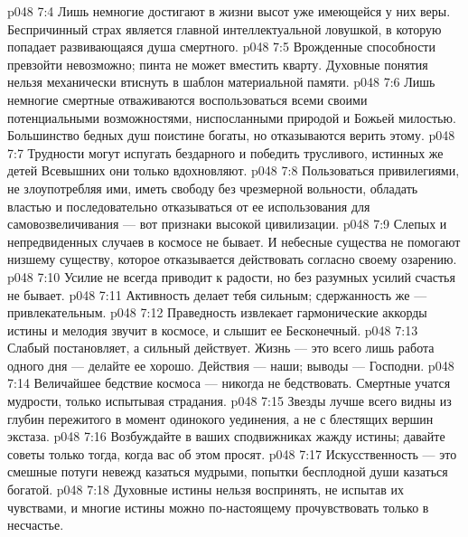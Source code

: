 \vs p048 7:4 \pc {}\bibnobreakspace Лишь немногие достигают в жизни высот уже имеющейся у них веры. Беспричинный страх является главной интеллектуальной ловушкой, в которую попадает развивающаяся душа смертного.
\vs p048 7:5 \pc {}\bibnobreakspace Врожденные способности превзойти невозможно; пинта не может вместить кварту. Духовные понятия нельзя механически втиснуть в шаблон материальной памяти.
\vs p048 7:6 \pc {}\bibnobreakspace Лишь немногие смертные отваживаются воспользоваться всеми своими потенциальными возможностями, ниспосланными природой и Божьей милостью. Большинство бедных душ поистине богаты, но отказываются верить этому.
\vs p048 7:7 \pc {}\bibnobreakspace Трудности могут испугать бездарного и победить трусливого, истинных же детей Всевышних они только вдохновляют.
\vs p048 7:8 \pc {}\bibnobreakspace Пользоваться привилегиями, не злоупотребляя ими, иметь свободу без чрезмерной вольности, обладать властью и последовательно отказываться от ее использования для самовозвеличивания --- вот признаки высокой цивилизации.
\vs p048 7:9 \pc {}\bibnobreakspace Слепых и непредвиденных случаев в космосе не бывает. И небесные существа не помогают низшему существу, которое отказывается действовать согласно своему озарению.
\vs p048 7:10 \pc {}\bibnobreakspace Усилие не всегда приводит к радости, но без разумных усилий счастья не бывает.
\vs p048 7:11 \pc {}\bibnobreakspace Активность делает тебя сильным; сдержанность же --- привлекательным.
\vs p048 7:12 \pc {}\bibnobreakspace Праведность извлекает гармонические аккорды истины и мелодия звучит в космосе, и слышит ее Бесконечный.
\vs p048 7:13 \pc {}\bibnobreakspace Слабый постановляет, а сильный действует. Жизнь --- это всего лишь работа одного дня --- делайте ее хорошо. Действия --- наши; выводы --- Господни.
\vs p048 7:14 \pc {}\bibnobreakspace Величайшее бедствие космоса --- никогда не бедствовать. Смертные учатся мудрости, только испытывая страдания.
\vs p048 7:15 \pc {}\bibnobreakspace Звезды лучше всего видны из глубин пережитого в момент одинокого уединения, а не с блестящих вершин экстаза.
\vs p048 7:16 \pc {}\bibnobreakspace Возбуждайте в ваших сподвижниках жажду истины; давайте советы только тогда, когда вас об этом просят.
\vs p048 7:17 \pc {}\bibnobreakspace Искусственность --- это смешные потуги невежд казаться мудрыми, попытки бесплодной души казаться богатой.
\vs p048 7:18 \pc {}\bibnobreakspace Духовные истины нельзя воспринять, не испытав их чувствами, и многие истины можно по\hyp{}настоящему прочувствовать только в несчастье.

